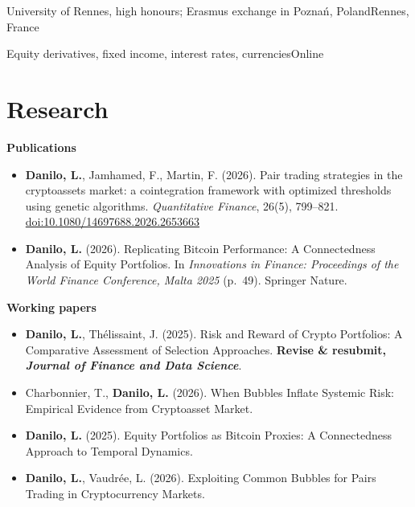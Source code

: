 \documentclass[10pt]{article}
\begin{document}
\entrygap
{}
      {University of Rennes, high honours; Erasmus exchange in Poznań, Poland}{Rennes, France}

\entrygap
{}
      {Equity derivatives, fixed income, interest rates, currencies}{Online}

\newpage
\section{Research}

\textbf{Publications}
\begin{itemize}
  \item \textbf{Danilo, L.}, Jamhamed, F., Martin, F. (2026). Pair trading strategies in the
        cryptoassets market: a cointegration framework with optimized thresholds using genetic
        algorithms. \textit{Quantitative Finance}, 26(5), 799--821.
        \href{https://doi.org/10.1080/14697688.2026.2653663}{doi:10.1080/14697688.2026.2653663}
  \item \textbf{Danilo, L.} (2026). Replicating Bitcoin Performance: A Connectedness Analysis of
        Equity Portfolios. In \textit{Innovations in Finance: Proceedings of the World Finance Conference,
        Malta 2025} (p.~49). Springer Nature.
\end{itemize}

\vspace{3pt}
\textbf{Working papers}
\begin{itemize}
  \item \textbf{Danilo, L.}, Thélissaint, J. (2025). Risk and Reward of Crypto Portfolios: A
        Comparative Assessment of Selection Approaches. \textbf{Revise \& resubmit,
        \textit{Journal of Finance and Data Science}}.
  \item Charbonnier, T., \textbf{Danilo, L.} (2026). When Bubbles Inflate Systemic Risk: Empirical
        Evidence from Cryptoasset Market.
  \item \textbf{Danilo, L.} (2025). Equity Portfolios as Bitcoin Proxies: A Connectedness Approach to
        Temporal Dynamics. %
  \item \textbf{Danilo, L.}, Vaudrée, L. (2026). Exploiting Common Bubbles for Pairs Trading in
        Cryptocurrency Markets.
\end{itemize}
\end{document}
